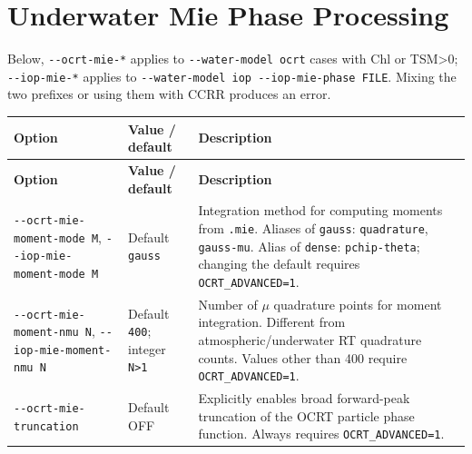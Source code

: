 \section{Underwater Mie Phase Processing}
\label{sec:auto:03_options:6}
Below, \texttt{-\allowbreak{}-\allowbreak{}ocrt-\allowbreak{}mie-\allowbreak{}*} applies to \texttt{-\allowbreak{}-\allowbreak{}water-\allowbreak{}model ocrt} cases with Chl or TSM>0; \texttt{-\allowbreak{}-\allowbreak{}iop-\allowbreak{}mie-\allowbreak{}*} applies to \texttt{-\allowbreak{}-\allowbreak{}water-\allowbreak{}model iop -\allowbreak{}-\allowbreak{}iop-\allowbreak{}mie-\allowbreak{}phase FILE}. Mixing the two prefixes or using them with CCRR produces an error.


{\TableFont
\begin{longtable}{@{}>{\raggedright\arraybackslash}p{}>{\raggedright\arraybackslash}p{}>{\raggedright\arraybackslash}p{}@{}}
\toprule
\textbf{Option} & \textbf{Value / default} & \textbf{Description} \\
\midrule
\endfirsthead
\toprule
\textbf{Option} & \textbf{Value / default} & \textbf{Description} \\
\midrule
\endhead
\bottomrule
\endfoot
\texttt{-\allowbreak{}-\allowbreak{}ocrt-\allowbreak{}mie-\allowbreak{}moment-\allowbreak{}mode M}, \texttt{-\allowbreak{}-\allowbreak{}iop-\allowbreak{}mie-\allowbreak{}moment-\allowbreak{}mode M} & Default \texttt{gauss} & Integration method for computing moments from \texttt{.\allowbreak{}mie}. Aliases of \texttt{gauss}: \texttt{quadrature}, \texttt{gauss-\allowbreak{}mu}. Alias of \texttt{dense}: \texttt{pchip-\allowbreak{}theta}; changing the default requires \texttt{OCRT\_\allowbreak{}ADVANCED=\allowbreak{}1}. \\
\texttt{-\allowbreak{}-\allowbreak{}ocrt-\allowbreak{}mie-\allowbreak{}moment-\allowbreak{}nmu N}, \texttt{-\allowbreak{}-\allowbreak{}iop-\allowbreak{}mie-\allowbreak{}moment-\allowbreak{}nmu N} & Default \texttt{400}; integer \texttt{N>1} & Number of \ensuremath{\mu} quadrature points for moment integration. Different from atmospheric/underwater RT quadrature counts. Values other than 400 require \texttt{OCRT\_\allowbreak{}ADVANCED=\allowbreak{}1}. \\
\texttt{-\allowbreak{}-\allowbreak{}ocrt-\allowbreak{}mie-\allowbreak{}truncation} & Default OFF & Explicitly enables broad forward-peak truncation of the OCRT particle phase function. Always requires \texttt{OCRT\_\allowbreak{}ADVANCED=\allowbreak{}1}. \\

\end{longtable}}
